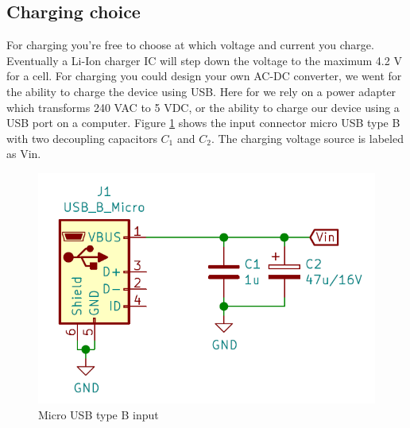\documentclass[11pt,a4paper]{article}
\begin{document}
\subsection{Charging choice}
For charging you're free to choose at which voltage and current you charge. Eventually a Li-Ion charger IC will step down the voltage to the maximum 4.2 V for a cell. For charging you could design your own AC-DC converter, we went for the ability to charge the device using USB. Here for we rely on a power adapter which transforms 240 VAC to 5 VDC, or the ability to charge our device using a USB port on a computer. Figure \ref{fig:microUSBinput} shows the input connector micro USB type B with two decoupling capacitors $C_1$ and $C_2$. The charging voltage source is labeled as Vin.
\begin{figure}[H]
	\centering
	\includegraphics[width=0.8\linewidth]{microUSBinput.png}
	\caption{Micro USB type B input}
	\label{fig:microUSBinput}
\end{figure}
\end{document}
